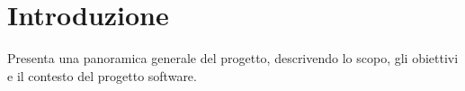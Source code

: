 \chapter{Introduzione} \label{chap:Introduzione}
Presenta una panoramica generale del progetto, descrivendo lo scopo, gli obiettivi e il contesto del progetto software.